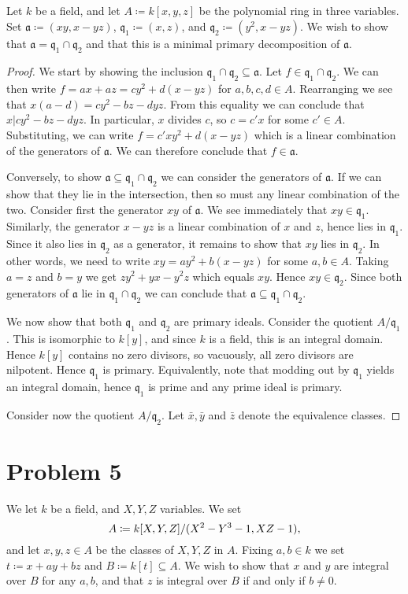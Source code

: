 \documentclass{article}
\newcommand{\q}{\mathfrak{q}}
\renewcommand{\a}{\mathfrak{a}}
\begin{document}
Let $k$ be a field, and let $A \coloneqq k[x, y, z]$ be the polynomial
ring in three variables. Set $\a \coloneqq (xy, x-yz)$, $\q_1 \coloneqq
(x, z)$, and $\q_2 \coloneqq (y^2, x-yz)$. We wish to show that $\a = \q_1
\cap \q_2$ and that this is a minimal primary decomposition of $\a$.
\begin{proof}
    We start by showing the inclusion $\q_1 \cap \q_2 \subseteq \a$. Let $f \in
    \q_1 \cap \q_2$. We can then write $f = ax + az = cy^2 + d(x - yz)$ for $a,
    b, c, d \in A$.  Rearranging we see that $x(a - d) = cy^2 - bz - dyz$. From
    this equality we can conclude that $x | cy^2 - bz - dyz$. In particular,
    $x$ divides $c$, so $c = c'x$ for some $c' \in A$. Substituting, we can
    write $f = c'xy^2 + d(x - yz)$ which is a linear combination of the
    generators of $\a$. We can therefore conclude that $f \in \a$.

    Conversely, to show $\a \subseteq \q_1 \cap \q_2$ we can consider the
    generators of $\a$. If we can show that they lie in the intersection, then
    so must any linear combination of the two. Consider first the generator
    $xy$ of $\a$. We see immediately that $xy \in \q_1$. Similarly, the
    generator $x - yz$ is a linear combination of $x$ and $z$, hence lies in
    $\q_1$. Since it also lies in $\q_2$ as a generator, it remains to show
    that $xy$ lies in $\q_2$. In other words, we need to write $xy = ay^2 + b(x
    - yz)$ for some $a, b \in A$. Taking $a = z$ and $b = y$ we get $zy^2 + yx
    - y^2z$ which equals $xy$. Hence $xy \in \q_2$. Since both generators of
    $\a$ lie in $\q_1 \cap \q_2$ we can conclude that $\a \subseteq \q_1 \cap
    \q_2$.

    We now show that both $\q_1$ and $\q_2$ are primary ideals. Consider the
    quotient $A / \q_1$. This is isomorphic to $k[y]$, and since $k$ is a
    field, this is an integral domain. Hence $k[y]$ contains no zero divisors,
    so vacuously, all zero divisors are nilpotent. Hence $\q_1$ is primary.
    Equivalently, note that modding out by $\q_1$ yields an integral domain,
    hence $\q_1$ is prime and any prime ideal is primary.
    
    Consider now the quotient $A / \q_2$. Let $\bar{x}, \bar{y}$ and $\bar{z}$
    denote the equivalence classes.
\end{proof}

\section*{Problem 5}
We let $k$ be a field, and $X, Y, Z$ variables. We set
\begin{equation}
    \notag
    A \coloneqq k[X, Y, Z] / (X^2- Y^3 - 1, XZ - 1), 
\end{equation}
and let $x, y, z \in A$ be the classes of $X, Y, Z$ in $A$. Fixing $a, b
\in k$ we set $t \coloneqq x + ay + bz$ and $B \coloneqq k[t] \subseteq
A$. We wish to show that $x$ and $y$ are integral over $B$ for any $a, b$,
and that $z$ is integral over $B$ if and only if $b \neq 0$.
\end{document}
